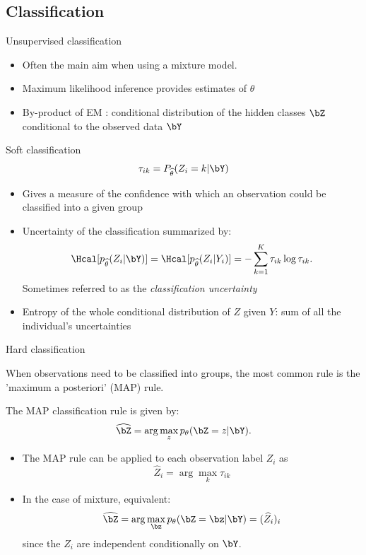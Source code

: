 \documentclass[compress,10pt]{beamer}
\begin{document}
\subsection{Classification} \label{Subsec/ MixtClassif}
\begin{frame}{Unsupervised classification}
 \begin{itemize}
  \item Often the main aim when using a mixture model. 
  \item Maximum likelihood inference provides estimates of  $\theta$
  \item By-product of EM : conditional distribution of the hidden classes $\bZ$ conditional to the observed data $\bY$
\end{itemize}
\end{frame}
\begin{frame}{Soft classification}
$$\tau_{ik} = P_{\widehat{\theta}}(Z_i = k | \bY)$$
 \begin{itemize}
  \item Gives a measure of the confidence with which an observation could be classified into a given group
\item Uncertainty of the classification   summarized by: 
$$
\Hcal[p_{\widehat{\theta}}(Z_i|\bY)] = \Hcal[p_{\widehat{\theta}}(Z_i|Y_i)] = - \sum_{k=1}^K \tau_{ik} \log \tau_{ik}.
$$
Sometimes referred to as the {\sl classification uncertainty}
\item Entropy of the whole conditional distribution of $Z$  given $Y$: sum of all the individual's uncertainties
\end{itemize}  
\end{frame}
\begin{frame}{Hard classification}

When observations need to be classified into groups, the most common rule is the 'maximum a posteriori' (MAP) rule.

\begin{definition} \label{Def:MAP}
 The MAP classification rule is given by:
$$
\widehat{\bZ} = \arg\max_z p_\theta(\bZ=z | \bY).
$$
\end{definition}

 
\begin{itemize}
 \item The MAP rule can be applied to each observation label $Z_i$ as
$$
\widehat{Z}_i = \arg\max_k \tau_{ik}
$$
\item In the case of mixture, equivalent:
$$
\widehat{\bZ} = \arg\max_\bz p_\theta(\bZ=\bz | \bY) = (\widehat{Z}_i)_i
$$
since the $Z_i$ are independent conditionally on $\bY$.
\end{itemize}
 
\end{frame}
\end{document}
